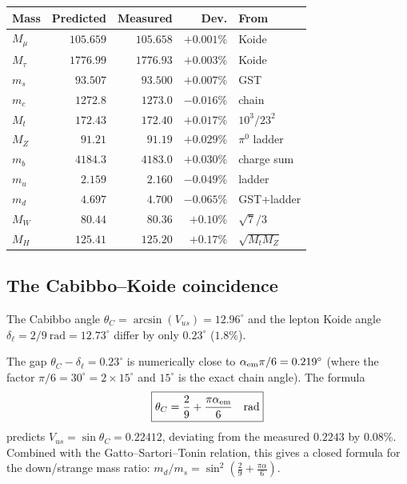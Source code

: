 \documentclass[11pt]{article}
\begin{document}
\begin{center}\scriptsize
\setlength{\tabcolsep}{3pt}
\begin{tabular}{@{}l r r r l@{}}
\toprule
Mass & Predicted & Measured & Dev. & From \\
\midrule
$M_\mu$ & $105.659$ & $105.658$ & $+0.001\%$ & Koide \\
$M_\tau$ & $1776.99$ & $1776.93$ & $+0.003\%$ & Koide \\
$m_s$ & $93.507$ & $93.500$ & $+0.007\%$ & GST \\
$m_c$ & $1272.8$ & $1273.0$ & $-0.016\%$ & chain \\
$M_t$ & $172.43$ & $172.40$ & $+0.017\%$ & $10^3/23^2$ \\
$M_Z$ & $91.21$ & $91.19$ & $+0.029\%$ & $\pi^0$ ladder \\
$m_b$ & $4184.3$ & $4183.0$ & $+0.030\%$ & charge sum \\
$m_u$ & $2.159$ & $2.160$ & $-0.049\%$ & ladder \\
$m_d$ & $4.697$ & $4.700$ & $-0.065\%$ & GST+ladder \\
$M_W$ & $80.44$ & $80.36$ & $+0.10\%$ & $\sqrt{7}/3$ \\
$M_H$ & $125.41$ & $125.20$ & $+0.17\%$ & $\sqrt{M_tM_Z}$ \\
\bottomrule
\end{tabular}
\end{center}

\subsection{The Cabibbo--Koide coincidence}

The Cabibbo angle $\theta_C = \arcsin(V_{us}) = 12.96^\circ$
and the lepton Koide angle $\delta_{\ell} = 2/9~\text{rad}
= 12.73^\circ$ differ by only $0.23^\circ$ ($1.8\%$).

The gap $\theta_C - \delta_\ell = 0.23^\circ$ is numerically
close to $\alpha_{\rm em}\pi/6 = 0.219^\circ$ (where the
factor $\pi/6 = 30^\circ = 2\times 15^\circ$ and $15^\circ$ is
the exact chain angle).  The formula
\begin{equation}
  \boxed{\theta_C = \frac{2}{9} + \frac{\pi\alpha_{\rm em}}{6}
  \quad\text{rad}}
  \label{eq:cabibbo}
\end{equation}
predicts $V_{us} = \sin\theta_C = 0.22412$, deviating from the
measured $0.2243$ by $0.08\%$.  Combined with the
Gatto--Sartori--Tonin relation, this gives a closed formula for
the down/strange mass ratio:
$m_d/m_s = \sin^2\!\left(\frac{2}{9}+\frac{\pi\alpha}{6}\right)$.
\end{document}
